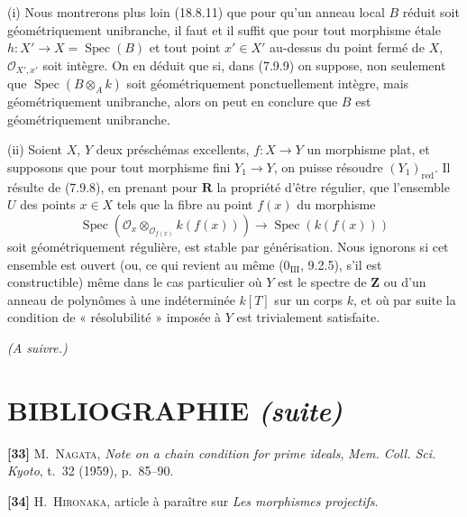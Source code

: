 \begin{remarks}[7.9.10]
\label{IV.2.s7.9.10-fr}
(i) Nous montrerons plus loin (18.8.11) que pour qu'un anneau local $B$ réduit
soit géométriquement unibranche, il faut et il suffit que pour tout morphisme
étale $h:X'\to X=\operatorname{Spec}(B)$ et tout point $x'\in X'$ au-dessus
du point fermé de $X$, $\mathcal O_{X',x'}$ soit intègre. On en déduit que si,
dans (7.9.9) on suppose, non seulement que
$\operatorname{Spec}(B\otimes_Ak)$ soit géométriquement ponctuellement
intègre, mais géométriquement unibranche, alors on peut en conclure que $B$ est
géométriquement unibranche.


(ii) Soient $X$, $Y$ deux préschémas excellents, $f:X\to Y$ un morphisme
plat, et supposons que pour tout morphisme fini $Y_1\to Y$, on puisse résoudre
$(Y_1)_{\mathrm{red}}$. Il résulte de (7.9.8), en prenant pour
$\boldsymbol R$ la propriété d'être régulier, que l'ensemble $U$ des points
$x\in X$ tels que la fibre au point $f(x)$ du morphisme
\[
\operatorname{Spec}(\mathcal O_x\otimes_{\mathcal O_{f(x)}}k(f(x)))
\longrightarrow\operatorname{Spec}(k(f(x)))
\]
soit géométriquement régulière, est stable par générisation. Nous ignorons si
cet ensemble est ouvert (ou, ce qui revient au même (0$_{\mathrm{III}}$,
9.2.5), s'il est constructible) même dans le cas particulier où $Y$ est le
spectre de $\mathbf Z$ ou d'un anneau de polynômes à une indéterminée $k[T]$
sur un corps $k$, et où par suite la condition de « résolubilité » imposée à
$Y$ est trivialement satisfaite.
\end{remarks}

\begin{center}
\emph{(A suivre.)}
\end{center}

\clearpage
{}
{}
\section*{BIBLIOGRAPHIE \textnormal{\emph{(suite)}}}

\begingroup
\small
\setlength{\parindent}{0pt}
\setlength{\parskip}{4pt}

\textbf{[33]} M.~\textsc{Nagata}, \emph{Note on a chain condition for prime
ideals}, \emph{Mem. Coll. Sci. Kyoto}, t.~32 (1959), p.~85--90.

\textbf{[34]} H.~\textsc{Hironaka}, article à paraître sur \emph{Les morphismes
projectifs}.

